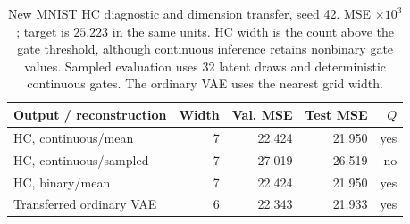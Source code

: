 \begin{table}[H]
\caption{New MNIST HC diagnostic and dimension transfer, seed 42. MSE $\times10^3$; target is $25.223$ in the same units. HC width is the count above the gate threshold, although continuous inference retains nonbinary gate values. Sampled evaluation uses 32 latent draws and deterministic continuous gates. The ordinary VAE uses the nearest grid width.}\label{tab:native_hc}
\small
\setlength{\tabcolsep}{3pt}
\begin{tabular*}{\textwidth}{@{\extracolsep{\fill}}lrrrr@{}}
\toprule
Output / reconstruction & Width & Val. MSE & Test MSE & $Q$ \\
\midrule
HC, continuous/mean & 7 & 22.424 & 21.950 & yes \\
HC, continuous/sampled & 7 & 27.019 & 26.519 & no \\
HC, binary/mean & 7 & 22.424 & 21.950 & yes \\
Transferred ordinary VAE & 6 & 22.343 & 21.933 & yes \\
\bottomrule\end{tabular*}
\end{table}
